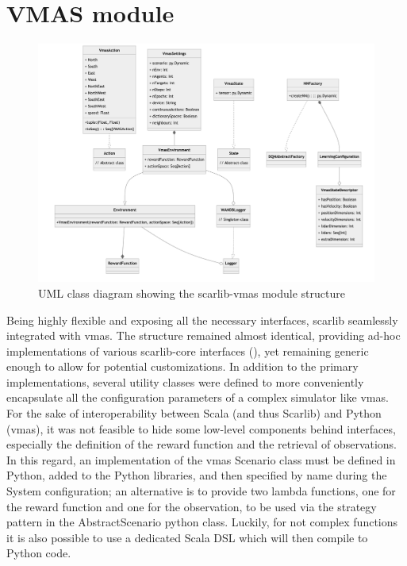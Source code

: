\documentclass[12pt,a4paper,openright,twoside]{book}
\begin{document}
\section{VMAS module}
\begin{figure}
\includegraphics[width=\textwidth]{img/scarlib-vmas.png}
\caption{UML class diagram showing the scarlib-vmas module structure}
\label{fig:scarlib-vmas}
\end{figure}
Being highly flexible and exposing all the necessary interfaces, scarlib seamlessly integrated with \ac{vmas}. The structure remained almost identical, providing ad-hoc implementations of various scarlib-core interfaces (), yet remaining generic enough to allow for potential customizations. In addition to the primary implementations, several utility classes were defined to more conveniently encapsulate all the configuration parameters of a complex simulator like \ac{vmas}.
For the sake of interoperability between Scala (and thus Scarlib) and Python (\ac{vmas}), it was not feasible to hide some low-level components behind interfaces, especially the definition of the reward function and the retrieval of observations. In this regard, an implementation of the \ac{vmas} Scenario class must be defined in Python, added to the Python libraries, and then specified by name during the System configuration; an alternative is to provide two lambda functions, one for the reward function and one for the observation, to be used via the strategy pattern in the AbstractScenario python class. 
Luckily, for not complex functions it is also possible to use a dedicated Scala DSL which will then compile to Python code.
\end{document}
